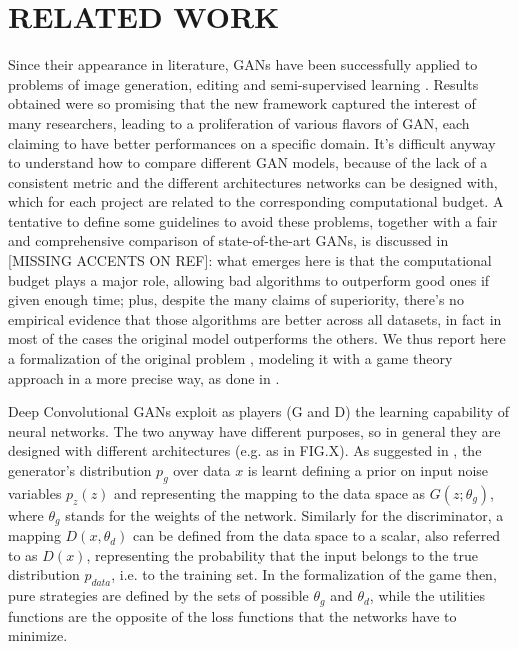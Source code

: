 \section{RELATED WORK} \label{relatedwork}

Since their appearance in literature, GANs have been successfully applied to problems of image generation, editing and semi-supervised learning \cite{DBLP:journals/corr/RadfordMC15} \cite{DBLP:journals/corr/ZhangXLZHWM16}.
Results obtained were so promising that the new framework captured the interest of many researchers, leading to a proliferation of various flavors of GAN, each claiming to have better performances on a specific domain.
It's difficult anyway to understand how to compare different GAN models, because of the lack of a consistent metric and the different architectures networks can be designed with, which for each project are related to the corresponding computational budget.
A tentative to define some guidelines to avoid these problems, together with a fair and comprehensive comparison of state-of-the-art GANs, is discussed in \cite{46506}[MISSING ACCENTS ON REF]: what emerges here is that the computational budget plays a major role, allowing bad algorithms to outperform good ones if given enough time; plus, despite the many claims of superiority, there's no empirical evidence that those algorithms are better across all datasets, in fact in most of the cases the original model outperforms the others.
We thus report here a formalization of the original problem \cite{NIPS2014_5423}, modeling it with a game theory approach in a more precise way, as done in \cite{2017arXiv171200679O}.

Deep Convolutional GANs exploit as players (G and D) the learning capability of neural networks. The two anyway have different purposes, so in general they are designed with different architectures (e.g. as in FIG.X).
As suggested in \cite{NIPS2014_5423}, the generator's distribution $p_g$ over data $x$ is learnt defining a prior on input noise variables $p_z(z)$ and representing the mapping to the data space as $G(z;\theta_g)$, where $\theta_g$ stands for the weights of the network.
Similarly for the discriminator, a mapping $D(x,\theta_d)$ can be defined from the data space to a scalar, also referred to as $D(x)$, representing the probability that the input belongs to the true distribution $p_{data}$, i.e. to the training set.
In the formalization of the game then, pure strategies are defined by the sets of possible $\theta_g$ and $\theta_d$, while the utilities functions are the opposite of the loss functions that the networks have to minimize.

